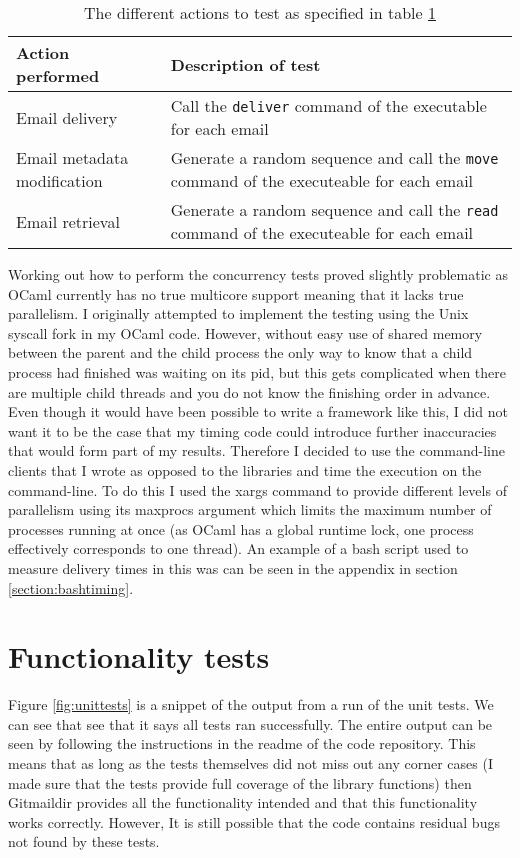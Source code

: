 \begin{table}[h]
\footnotesize
\centering
\begin{tabular}{p{4cm} p{10.5cm}}
  \toprule
  Action performed & Description of test \\
  \midrule
  Email delivery & Call the \texttt{deliver} command of the executable for each email \\
  Email metadata modification & Generate a random sequence and call the \texttt{move} command of the executeable for each email \\
  Email retrieval & Generate a random sequence and call the \texttt{read} command of the executeable for each email \\
  \bottomrule
\end{tabular}
\caption{The different actions to test as specified in table \ref{table:actions}}
\label{table:actions}
\end{table}

Working out how to perform the concurrency tests proved slightly problematic as OCaml currently has no true multicore support meaning that it lacks true parallelism. I originally attempted to implement the testing using the Unix syscall fork in my OCaml code. However, without easy use of shared memory between the parent and the child process the only way to know that a child process had finished was waiting on its pid, but this gets complicated when there are multiple child threads and you do not know the finishing order in advance. Even though it would have been possible to write a framework like this, I did not want it to be the case that my timing code could introduce further inaccuracies that would form part of my results. Therefore I decided to use the command-line clients that I wrote as opposed to the libraries and time the execution on the command-line. To do this I used the xargs command to provide different levels of parallelism using its maxprocs argument which limits the maximum number of processes running at once (as OCaml has a global runtime lock, one process effectively corresponds to one thread). An example of a bash script used to measure delivery times in this was can be seen in the appendix in section \ref{section:bashtiming}.

\section{Functionality tests} \label{section:functionality_tests}

Figure \ref{fig:unittests} is a snippet of the output from a run of the unit tests. We can see that see that it says all tests ran successfully. The entire output can be seen by following the instructions in the readme of the code repository. This means that as long as the tests themselves did not miss out any corner cases (I made sure that the tests provide full coverage of the library functions) then Gitmaildir provides all the functionality intended and that this functionality works correctly. However, It is still possible that the code contains residual bugs not found by these tests.

